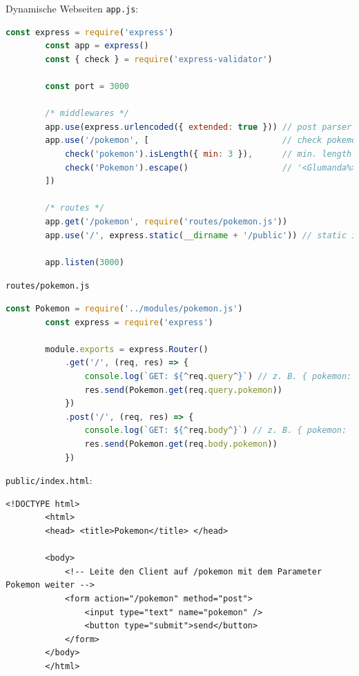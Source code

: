 \begin{example}{Dynamische Webseiten}
    \texttt{app.js}:
    \begin{lstlisting}[language=JavaScript]
        const express = require('express')
        const app = express()
        const { check } = require('express-validator')

        const port = 3000

        /* middlewares */
        app.use(express.urlencoded({ extended: true })) // post parser
        app.use('/pokemon', [                           // check pokemon
            check('pokemon').isLength({ min: 3 }),      // min. length 3 chars (z. B. Mew)
            check('Pokemon').escape()                   // '<Glumanda%>' -> '&lt;Glumanda%&gt;'
        ])

        /* routes */
        app.get('/pokemon', require('routes/pokemon.js'))
        app.use('/', express.static(__dirname + '/public')) // static index.html, js/*, css/* etc.

        app.listen(3000)
    \end{lstlisting}

    \texttt{routes/pokemon.js}
    \begin{lstlisting}[language=JavaScript]
        const Pokemon = require('../modules/pokemon.js')
        const express = require('express')

        module.exports = express.Router()
            .get('/', (req, res) => {
                console.log(`GET: ${^req.query^}`) // z. B. { pokemon: 'Glumanda' } bei GET
                res.send(Pokemon.get(req.query.pokemon))
            })
            .post('/', (req, res) => {
                console.log(`GET: ${^req.body^}`) // z. B. { pokemon: 'Glumanda' } bei POST
                res.send(Pokemon.get(req.body.pokemon))
            })
    \end{lstlisting}

    \texttt{public/index.html}:
    \begin{lstlisting}[language=HTML5]
        <!DOCTYPE html>
        <html>
        <head> <title>Pokemon</title> </head>

        <body>
            <!-- Leite den Client auf /pokemon mit dem Parameter Pokemon weiter -->
            <form action="/pokemon" method="post">
                <input type="text" name="pokemon" />
                <button type="submit">send</button>
            </form>
        </body>
        </html>
    \end{lstlisting}
\end{example}

